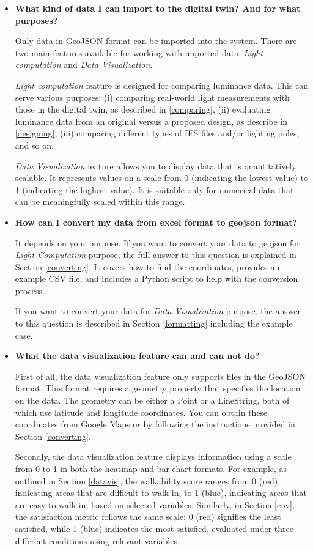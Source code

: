 \begin{itemize}
    \item \textbf{What kind of data I can import to the digital twin? And for what purposes?}

    Only data in GeoJSON format can be imported into the system. There are two main features available for working with imported data: \textit{Light computation} and \textit{Data Visualization}. 
    
    \textit{Light computation} feature is designed for comparing luminance data. This can serve various purposes: (i) comparing real-world light measurements with those in the digital twin, as described in \ref{comparing}, (ii) evaluating luminance data from an original versus a proposed design, as describe in \ref{designing}, (iii) comparing different types of IES files and/or lighting poles, and so on.

    \textit{Data Visualization} feature allows you to display data that is quantitatively scalable. It represents values on a scale from 0 (indicating the lowest value) to 1 (indicating the highest value). It is suitable only for numerical data that can be meaningfully scaled within this range.
    
    \item \textbf{How can I convert my data from excel format to geojson format?}

    It depends on your purpose. If you want to convert your data to geojson for \textit{Light Computation} purpose, the full answer to this question is explained in Section \ref{converting}. It covers how to find the coordinates, provides an example CSV file, and includes a Python script to help with the conversion process.

    If you want to convert your data for \textit{Data Visualization} purpose, the answer to this question is described in Section \ref{formatting} including the example case. 
    
    \item \textbf{What the data visualization feature can and can not do?} 
    
    First of all, the data visualization feature only supports files in the GeoJSON format. This format requires a geometry property that specifies the location on the data. The geometry can be either a Point or a LineString, both of which use latitude and longitude coordinates. You can obtain these coordinates from Google Maps or by following the instructions provided in Section \ref{converting}.
    
    Secondly, the data visualization feature displays information using a scale from 0 to 1 in both the heatmap and bar chart formats. For example, as outlined in Section \ref{datavis}, the walkability score ranges from 0 (red), indicating areas that are difficult to walk in, to 1 (blue), indicating areas that are easy to walk in, based on selected variables. Similarly, in Section \ref{env}, the satisfaction metric follows the same scale: 0 (red) signifies the least satisfied, while 1 (blue) indicates the most satisfied, evaluated under three different conditions using relevant variables.
    

\end{itemize}
